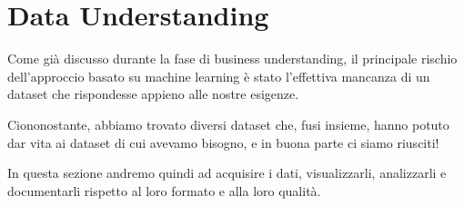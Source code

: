 \documentclass[a4paper, 11pt, oneside]{report}
\begin{document}
            \newpage
            \section{Data Understanding}
            Come già discusso durante la fase di business understanding, il principale rischio dell'approccio basato su machine
            learning è stato l'effettiva mancanza di un dataset che rispondesse appieno alle nostre esigenze.
            \par \noindent Ciononostante, abbiamo trovato diversi dataset che, fusi insieme, hanno potuto
            dar vita ai dataset di cui avevamo bisogno, e in buona parte ci siamo riusciti!
            \par \noindent In questa sezione andremo quindi ad acquisire i dati, visualizzarli, analizzarli e documentarli rispetto al loro
            formato e alla loro qualità.
\end{document}
